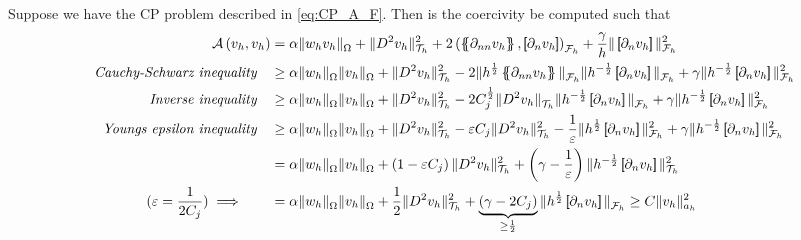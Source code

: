 Suppose we have the CP problem described in \eqref{eq:CP_A_F}. Then is the coercivity be computed such that
\[
    \begin{split}
\mathcal{A} \left( v_{h}, v_{h} \right) & =\alpha \|  w_{h}  v_{h} \|_{ \Omega  }^{  } +  \| D^2v_{h} \|_{ \mathcal{T} _{h} }^{2  }  + 2 \left(  \mean{ \partial _{nn} v_{h} }    ,  \jump{ \partial _{n}v_{h} }     \right) _{\mathcal{F} _{h}} +  \frac{\gamma}{h} \|  \jump{ \partial _{n} v_{h} }
  \|_{ \mathcal{F} _{h} }^{ 2 } \\
\quad \textit{Cauchy-Schwarz inequality} \quad
& \ge \alpha \| w_{h}  \|_{\Omega   }^{  } \| v_{h} \|_{\Omega   }^{  } +   \| D ^2 v_{h} \|_{ \mathcal{T} _{h} }^{2  } -2 \| h^{\frac{1}{2}} \mean{ \partial _{nn}v_{h} }    \|_{  \mathcal{F} _{h}}^{  } \| h^{-\frac{1}{2}} \jump{ \partial _{n}v_{h} }    \|_{  \mathcal{F} _{h}}^{  } + \gamma \| h^{-\frac{1}{2}}  \jump{ \partial _{n}v_{h} }   \|_{ \mathcal{F} _{h}  }^{ 2 } \\
\quad \textit{Inverse inequality} \quad
 &  \ge \alpha \| w_{h}  \|_{\Omega   }^{  } \| v_{h} \|_{\Omega   }^{  } + \| D ^2 v_{h}  \|_{ \mathcal{T} _{h}  }^{ 2  } - 2 C^{\frac{1}{2}}_{j} \|   D ^2 v_{h}    \|_{ \mathcal{T} _{h}  }^{  } \| h^{-\frac{1}{2}} \jump{ \partial _{n} v_{h} }   \|_{ \mathcal{F} _{h} }^{  }  + \gamma \| h^{ -\frac{1}{2}} \jump{
 \partial _{n } v_{h}}   \|_{ \mathcal{F}_{h}}^{2}  \\
\quad \textit{ Youngs epsilon inequality} \quad
  &  \ge\alpha \| w_{h}  \|_{\Omega   }^{  } \| v_{h} \|_{\Omega   }^{  } +  \| D ^2 v_{h} \|_{ \mathcal{T}_{h}  }^{2  } - \varepsilon C_{j} \| D ^2 v_{h} \|_{ \mathcal{T} _{h} }^{2  } - \frac{1}{\varepsilon } \| h^{\frac{1}{2}} \jump{ \partial _{n} v_{h} }   \|_{ \mathcal{F} _{h} }^{2  }  + \gamma \|
  h^{-\frac{1}{2}} \jump{ \partial _{n} v_{h}}   \|_{ \mathcal{F} _{h} }^{2  }  \\
  & =  \alpha \| w_{h}  \|_{\Omega   }^{  } \| v_{h} \|_{\Omega   }^{  } +\left( 1 - \varepsilon C_{j} \right) \| D ^2 v_{h} \|_{\mathcal{T} _{h}  }^{ 2 } + \left( \gamma  - \frac{1}{\varepsilon } \right) \| h^{-\frac{1}{2}} \jump{ \partial _{n} v_{h} }   \|_{ \mathcal{T} _{h} }^{ 2 } \\
  (\varepsilon  = \frac{1}{2 C_{j} })  \implies  \quad \quad &= \alpha \| w_{h}  \|_{\Omega   }^{  } \| v_{h} \|_{\Omega   }^{  } +\frac{1}{2} \| D ^2 v_{h} \|_{ \mathcal{T} _{h} }^{ 2 }  + \underbrace{\left( \gamma -2 C_{j} \right)}_{ \ge  \frac{1}{2}}  \| h^{\frac{1}{2}} \jump{ \partial _{n} v_{h} }   \|_{
  \mathcal{F} _{h} }^{  } \ge C \| v_{h} \|_{ a_{h} }^{  2}
    \end{split}
\]
